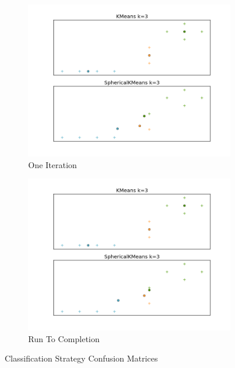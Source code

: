 \documentclass[11pt]{article}
\begin{document}
\begin{figure}[H]
\centering
\hspace*{-3cm} 
\begin{subfigure}{.5\textwidth}
  \centering
  \includegraphics[width=1.2\linewidth]{kmeans_vs_sphericalkmean_iter.png}
   \caption{One Iteration}
   \label{fig:kmeansiter}
\end{subfigure}%
\hspace*{1cm} 
\begin{subfigure}{.5\textwidth}
  \centering
  \includegraphics[width=1.2\linewidth]{kmeans_vs_sphericalkmean.png}
  \caption{Run To Completion}
   \label{fig:kmeansfull}
\end{subfigure}
\vspace{1cm}
\caption{Classification Strategy Confusion Matrices}
\label{fig:q5plot}
\end{figure}
\end{document}
